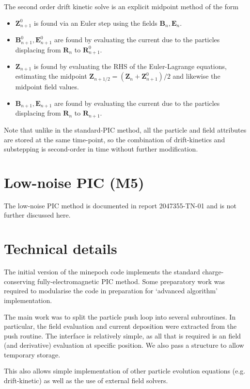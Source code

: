 \documentclass{article}
\begin{document}
The second order drift kinetic solve is an explicit midpoint method of the form
\begin{itemize}
\item
  $\mathbf{Z}_{n+1}^0$ is found via an Euler step using the fields $\mathbf{B}_n,\mathbf{E}_n$.
\item
  $\mathbf{B}^0_{n+1},\mathbf{E}^0_{n+1}$ are found by evaluating the current due to the particles displacing from $\mathbf{R}_n$ to $\mathbf{R}_{n+1}^0$.
\item
  $\mathbf{Z}_{n+1}$ is found by evaluating the RHS of the Euler-Lagrange equations, estimating the midpoint $\mathbf{Z}_{n+1/2} = (\mathbf{Z}_n + \mathbf{Z}_{n+1}^0)/2$ and likewise the midpoint field values.
\item
  $\mathbf{B}_{n+1},\mathbf{E}_{n+1}$ are found by evaluating the current due to the particles displacing from $\mathbf{R}_n$ to $\mathbf{R}_{n+1}$.
\end{itemize}

Note that unlike in the standard-PIC method, all the particle and field attributes are stored at the same time-point, so the combination of drift-kinetics and substepping is second-order in time without further modification.

\section{Low-noise PIC (M5) }

The low-noise PIC method is documented in report 2047355-TN-01 and is not further discussed here.

\section{Technical details}

The initial version of the minepoch code implements the standard charge-conserving fully-electromagnetic PIC method. Some preparatory work was required to modularise the code in preparation for `advanced algorithm' implementation.

The main work was to  split the particle push loop into several subroutines. In particular, the field evaluation and current deposition were extracted from the push routine. The interface is relatively simple, as all that is required is an field (and derivative) evaluation at specific position. We also pass a structure
to allow temporary storage.

This also allows simple implementation of other particle evolution equations (e.g. drift-kinetic) as well as the use of external field solvers.


\end{document}
